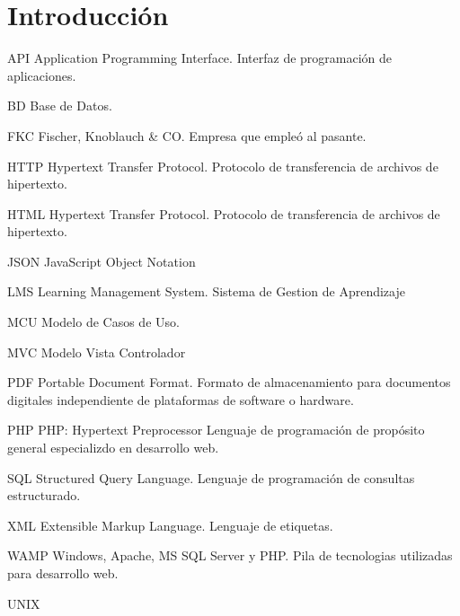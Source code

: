 \chapter*{Introducción}
\thispagestyle{empty} %

API
Application Programming Interface. Interfaz de programación de aplicaciones.

BD
Base de Datos.

FKC
Fischer, Knoblauch \& CO. Empresa que empleó al pasante.

HTTP
Hypertext Transfer Protocol. Protocolo de transferencia de archivos de hipertexto.

HTML
Hypertext Transfer Protocol. Protocolo de transferencia de archivos de hipertexto.

JSON
JavaScript Object Notation

LMS
Learning Management System. Sistema de Gestion de Aprendizaje

MCU
Modelo de Casos de Uso.

MVC
Modelo Vista Controlador

PDF Portable Document Format. 
Formato de almacenamiento para documentos digitales independiente de plataformas de software o hardware.

PHP 
PHP: Hypertext Preprocessor
Lenguaje de programación de propósito general especializdo en desarrollo web.

SQL
Structured Query Language. Lenguaje de programación de consultas estructurado.

XML
Extensible Markup Language. Lenguaje de etiquetas.

WAMP
Windows, Apache, MS SQL Server y PHP. Pila de tecnologias utilizadas para desarrollo web.

UNIX
